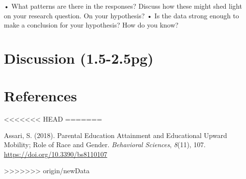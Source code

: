 \documentclass[
  man]{apa6}
\begin{document}
• What patterns are there in the responses? Discuss how these might shed light on your research question. On your hypothesis? • Is the data strong enough to make a conclusion for your hypothesis? How do you know?

\section{Discussion (1.5-2.5pg)}\label{discussion-1.5-2.5pg}

\newpage

\section*{References}\label{references}

<<<<<<< HEAD
=======
\label{refs}
\begin{CSLReferences}{1}{0}
Assari, S. (2018). Parental Education Attainment and Educational Upward Mobility; Role of Race and Gender. \emph{Behavioral Sciences}, \emph{8}(11), 107. \url{https://doi.org/10.3390/bs8110107}

\end{CSLReferences}

>>>>>>> origin/newData
\end{document}
